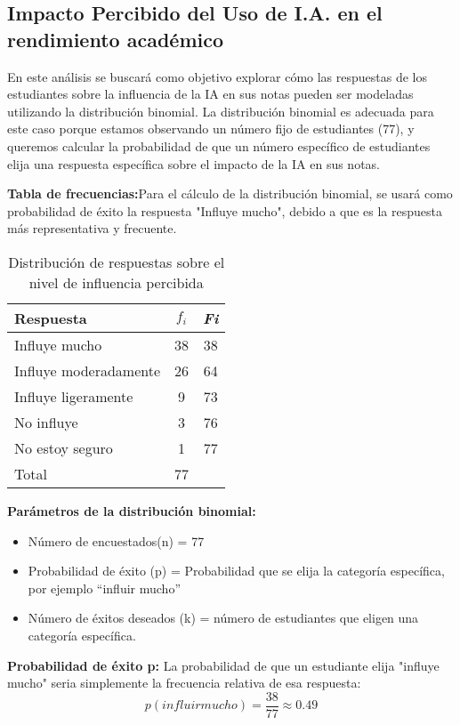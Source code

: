 \subsection{Impacto Percibido del Uso de I.A. en el rendimiento académico}
En este análisis se buscará como objetivo explorar cómo las respuestas de los estudiantes sobre la influencia de la IA en sus notas pueden ser modeladas utilizando la distribución binomial. La distribución binomial es adecuada para este caso porque estamos observando un número fijo de estudiantes (77), y queremos calcular la probabilidad de que un número específico de estudiantes elija una respuesta específica sobre el impacto de la IA en sus notas.

\textbf{Tabla de frecuencias:}Para el cálculo de la distribución binomial, se usará como probabilidad de éxito la respuesta "Influye mucho", debido a que es la respuesta más representativa y frecuente.
\begin{table}[H]
	\centering
	\renewcommand{\arraystretch}{1.2}
	\begin{tabular}{l c c}
		\hline
		{Respuesta} & {\(f_i\)} & \textit{Fi}\\
		\hline
		Influye mucho          & 38 & 38\\
		Influye moderadamente  & 26 & 64\\
		Influye ligeramente    & 9  & 73\\
		No influye             & 3  & 76\\
		No estoy seguro        & 1  & 77\\
		\hline
		Total                  & 77 & \\
		\hline
	\end{tabular}
	\caption{Distribución de respuestas sobre el nivel de influencia percibida}
	\label{tabla:influencia}
\end{table}

\textbf{Parámetros de la distribución binomial:}
\begin{itemize}
	\item Número de encuestados(n) = 77
	\item Probabilidad de éxito (p) = Probabilidad que se elija la categoría específica, por ejemplo “influir mucho”
	\item Número de éxitos deseados (k) = número de estudiantes que eligen una categoría específica.
\end{itemize}

\textbf{Probabilidad de éxito p:}
La probabilidad de que un estudiante elija "influye mucho" seria simplemente la frecuencia relativa de esa respuesta:
\begin{equation*}
	p(influir mucho) = \frac{38}{77} \approx 0.49
\end{equation*}

